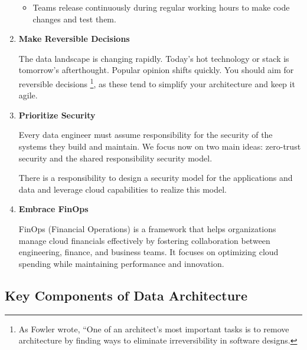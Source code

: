 \begin{enumerate}
\begin{itemize}
        \item Teams release continuously during regular working hours
        to make code changes and test them.
    \end{itemize}


    \item \textbf{Make Reversible Decisions}
    
    \noindent    
    The data landscape is changing rapidly. Today's hot technology or
    stack is tomorrow's afterthought. Popular opinion shifts quickly.
    You should aim for reversible decisions
    \footnote{
        As Fowler wrote, “One of an architect's most important tasks
        is to remove architecture by finding ways to eliminate
        irreversibility in software designs.
    },
    as these tend to simplify your architecture and keep it agile.


    \item \textbf{Prioritize Security}
    
    \noindent
    Every data engineer must assume responsibility for the security
    of the systems they build and maintain. We focus now on two main
    ideas: zero-trust security and the shared responsibility security
    model.

    There is a responsibility to design a security model for the
    applications and data and leverage cloud capabilities to realize
    this model.


    \item \textbf{Embrace FinOps}
    
    \noindent
    FinOps (Financial Operations) is a framework that helps
    organizations manage cloud financials effectively by fostering
    collaboration between engineering, finance, and business teams.
    It focuses on optimizing cloud spending while maintaining
    performance and innovation.
\end{enumerate}



\subsection{Key Components of Data Architecture}

